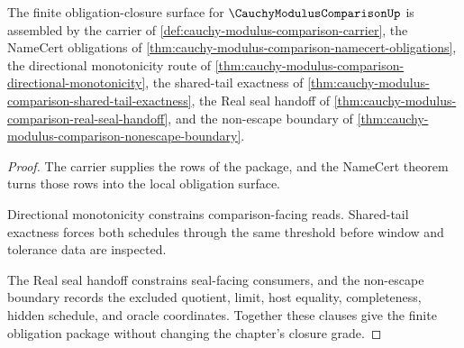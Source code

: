 \begin{theorem}
\label{thm:cauchy-modulus-comparison-obligation-closure-package}
The finite obligation-closure surface for $\CauchyModulusComparisonUp$ is assembled by the carrier of \autoref{def:cauchy-modulus-comparison-carrier}, the NameCert obligations of \autoref{thm:cauchy-modulus-comparison-namecert-obligations}, the directional monotonicity route of \autoref{thm:cauchy-modulus-comparison-directional-monotonicity}, the shared-tail exactness of \autoref{thm:cauchy-modulus-comparison-shared-tail-exactness}, the Real seal handoff of \autoref{thm:cauchy-modulus-comparison-real-seal-handoff}, and the non-escape boundary of \autoref{thm:cauchy-modulus-comparison-nonescape-boundary}.
\end{theorem}
\begin{proof}
The carrier supplies the rows of the package, and the NameCert theorem turns those rows into the local obligation surface.

Directional monotonicity constrains comparison-facing reads. Shared-tail exactness forces both schedules through the same threshold before window and tolerance data are inspected.

The Real seal handoff constrains seal-facing consumers, and the non-escape boundary records the excluded quotient, limit, host equality, completeness, hidden schedule, and oracle coordinates. Together these clauses give the finite obligation package without changing the chapter's closure grade.
\end{proof}

